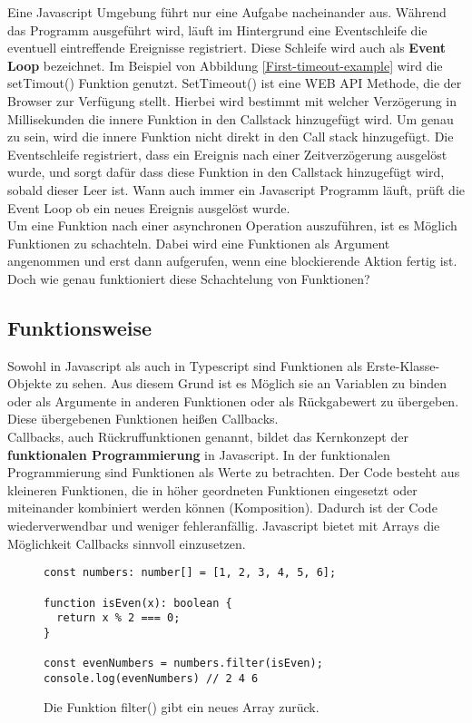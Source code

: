 \noindent
Eine Javascript Umgebung führt nur eine Aufgabe nacheinander aus. Während das Programm ausgeführt wird, läuft im Hintergrund eine Eventschleife die eventuell eintreffende Ereignisse registriert. Diese Schleife wird auch als \textbf{Event Loop} bezeichnet. Im Beispiel von Abbildung \ref{First-timeout-example} wird die setTimout() Funktion genutzt. SetTimeout() ist eine WEB API Methode, die der Browser zur Verfügung stellt. Hierbei wird bestimmt mit welcher Verzögerung in Millisekunden die innere Funktion in den Callstack hinzugefügt wird. Um genau zu sein, wird die innere Funktion nicht direkt in den Call stack hinzugefügt. Die Eventschleife registriert, dass ein Ereignis nach einer Zeitverzögerung ausgelöst wurde, und sorgt dafür dass diese Funktion in den Callstack hinzugefügt wird, sobald dieser Leer ist. Wann auch immer ein Javascript Programm läuft, prüft die Event Loop ob ein neues Ereignis ausgelöst wurde\cite{regular-event-loop}.\\

\noindent
Um eine Funktion nach einer asynchronen Operation auszuführen, ist es Möglich Funktionen zu schachteln. Dabei wird eine Funktionen als Argument angenommen und erst dann aufgerufen, wenn eine blockierende Aktion fertig ist. Doch wie genau funktioniert diese Schachtelung von Funktionen?

\subsection{Funktionsweise}

Sowohl in Javascript als auch in Typescript sind Funktionen als Erste-Klasse-Objekte zu sehen. Aus diesem Grund ist es Möglich sie an Variablen zu binden oder als Argumente in anderen Funktionen oder als Rückgabewert zu übergeben. Diese übergebenen Funktionen heißen Callbacks.\\

\noindent
Callbacks, auch Rückruffunktionen genannt, bildet das Kernkonzept der \textbf{funktionalen Programmierung} in Javascript\cite{callbacks-intro}. In der funktionalen Programmierung sind Funktionen als Werte zu betrachten. Der Code besteht aus kleineren Funktionen, die in höher geordneten Funktionen eingesetzt oder miteinander kombiniert werden können (Komposition). Dadurch ist der Code wiederverwendbar und weniger fehleranfällig. Javascript bietet mit Arrays die Möglichkeit Callbacks sinnvoll einzusetzen.

\begin{figure}[H]
\begin{lstlisting}[basicstyle=\small]
const numbers: number[] = [1, 2, 3, 4, 5, 6];

function isEven(x): boolean { 
  return x % 2 === 0; 
}

const evenNumbers = numbers.filter(isEven);
console.log(evenNumbers) // 2 4 6
\end{lstlisting}
\caption{Die Funktion filter() gibt ein neues Array zurück.}
\label{callbacks-with-arrays}
\end{figure}

